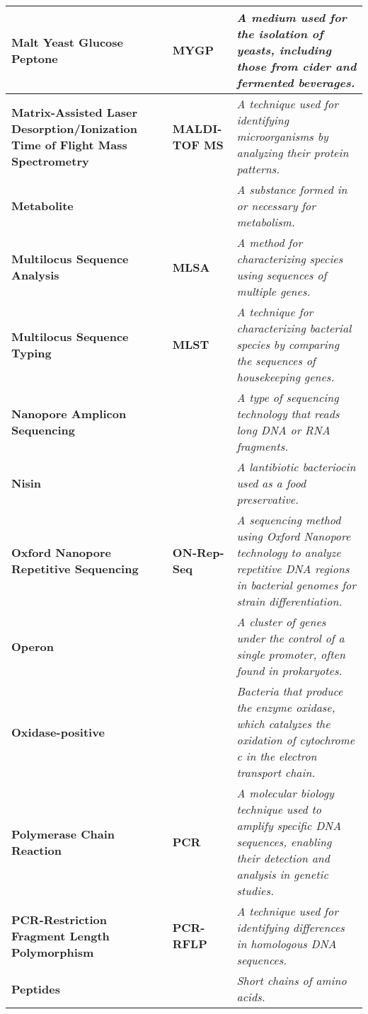 \begin{longtable}{| p{5cm} | p{2cm} | p{7.5cm} |}
    \hline
    \textbf{Malt Yeast Glucose Peptone} & \textbf{MYGP} & \textit{A medium used for the isolation of yeasts, including those from cider and fermented beverages.} \\
    \hline
    \textbf{Matrix-Assisted Laser Desorption/Ionization Time of Flight Mass Spectrometry} & \textbf{MALDI-TOF MS} & \textit{A technique used for identifying microorganisms by analyzing their protein patterns.} \\
    \hline
    \textbf{Metabolite} &  & \textit{A substance formed in or necessary for metabolism.} \\
    \hline
    \textbf{Multilocus Sequence Analysis} & \textbf{MLSA} & \textit{A method for characterizing species using sequences of multiple genes.} \\
    \hline
    \textbf{Multilocus Sequence Typing} & \textbf{MLST} & \textit{A technique for characterizing bacterial species by comparing the sequences of housekeeping genes.} \\
    \hline
    \textbf{Nanopore Amplicon Sequencing} &  & \textit{A type of sequencing technology that reads long DNA or RNA fragments.} \\
    \hline
    \textbf{Nisin} &  & \textit{A lantibiotic bacteriocin used as a food preservative.} \\
    \hline
    \textbf{Oxford Nanopore Repetitive Sequencing} & \textbf{ON-Rep-Seq} & \textit{A sequencing method using Oxford Nanopore technology to analyze repetitive DNA regions in bacterial genomes for strain differentiation.} \\
    \hline
    \textbf{Operon} &  & \textit{A cluster of genes under the control of a single promoter, often found in prokaryotes.} \\
    \hline
    \textbf{Oxidase-positive} &  & \textit{Bacteria that produce the enzyme oxidase, which catalyzes the oxidation of cytochrome c in the electron transport chain.} \\
    \hline
    \textbf{Polymerase Chain Reaction} & \textbf{PCR} & \textit{A molecular biology technique used to amplify specific DNA sequences, enabling their detection and analysis in genetic studies.} \\
    \hline
    \textbf{PCR-Restriction Fragment Length Polymorphism} & \textbf{PCR-RFLP} & \textit{A technique used for identifying differences in homologous DNA sequences.} \\
    \hline
    \textbf{Peptides} &  & \textit{Short chains of amino acids.} \\

\end{longtable}
